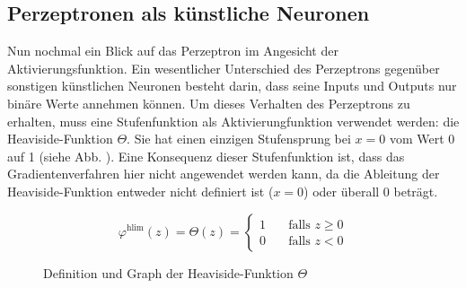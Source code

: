 \subsection{Perzeptronen als künstliche Neuronen}\label{sec:heaviside}
Nun nochmal ein Blick auf das Perzeptron im Angesicht der Aktivierungsfunktion.
Ein wesentlicher Unterschied des Perzeptrons gegenüber sonstigen künstlichen
Neuronen besteht darin, dass seine Inputs und Outputs nur binäre Werte
annehmen können. Um dieses Verhalten des Perzeptrons zu erhalten,
muss eine Stufenfunktion als Aktivierungfunktion verwendet werden: die Heaviside-Funktion $\Theta$.
Sie hat einen einzigen Stufensprung bei $x=0$ vom Wert 0 auf 1 (siehe Abb.
). Eine Konsequenz dieser Stufenfunktion ist, dass das
Gradientenverfahren hier nicht angewendet werden kann, da die Ableitung der
Heaviside-Funktion entweder nicht definiert ist ($x=0$) oder überall 0 beträgt.
\\
\begin{figure}[h!]
  \begin{minipage}[h!]{0.5\textwidth}
    \begin{equation*}
      \varphi^{\text{hlim}}(z) = \Theta(z) =
      \begin{cases}
        1 & \quad \text{falls } z \geq 0\\
        0 & \quad \text{falls } z < 0
      \end{cases}
    \end{equation*}
  \end{minipage}
  \begin{minipage}[h!]{0.5\textwidth}
    \centering
  \end{minipage}
  \caption{Definition und Graph der Heaviside-Funktion $\Theta$}
  \label{fig:heaviside}
\end{figure}

